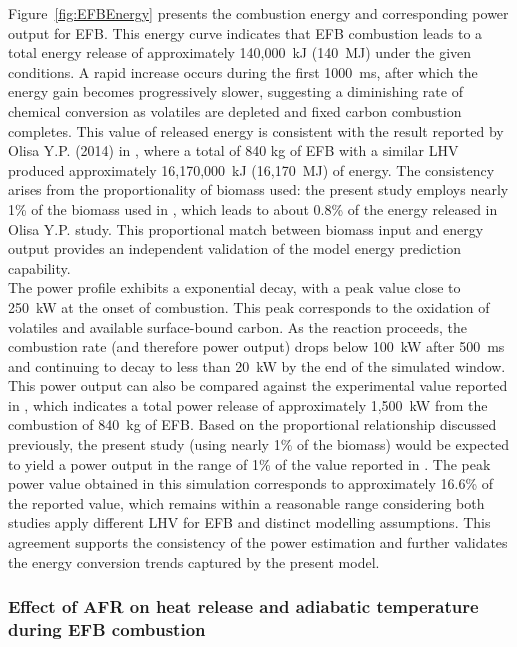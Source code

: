 \documentclass[preprint,12pt]{elsarticle}
\begin{document}
Figure~\ref{fig:EFBEnergy} presents the combustion energy and corresponding power output for EFB. This energy curve indicates that EFB combustion leads to a total energy release of approximately 140,000~kJ (140~MJ) under the given conditions. A rapid increase occurs during the first 1000~ms, after which the energy gain becomes progressively slower, suggesting a diminishing rate of chemical conversion as volatiles are depleted and fixed carbon combustion completes. This value of released energy is consistent with the result reported by Olisa Y.P. (2014) in \cite{Olisa2014}, where a total of 840 kg of EFB with a similar LHV produced approximately 16,170,000~kJ (16,170~MJ) of energy. The consistency arises from the proportionality of biomass used: the present study employs nearly 1\% of the biomass used in \cite{Olisa2014}, which leads to about 0.8\% of the energy released in Olisa Y.P. study. This proportional match between biomass input and energy output provides an independent validation of the model energy prediction capability. \\

The power profile exhibits a exponential decay, with a peak value close to 250~kW at the onset of combustion. This peak corresponds to the oxidation of volatiles and available surface-bound carbon. As the reaction proceeds, the combustion rate (and therefore power output) drops below 100~kW after 500~ms and continuing to decay to less than 20~kW by the end of the simulated window.\\

This power output can also be compared against the experimental value reported in \cite{Olisa2014}, which indicates a total power release of approximately 1,500~kW from the combustion of 840~kg of EFB. Based on the proportional relationship discussed previously, the present study (using nearly 1\% of the biomass) would be expected to yield a power output in the range of 1\% of the value reported in \cite{Olisa2014}. The peak power value obtained in this simulation corresponds to approximately 16.6\% of the reported value, which remains within a reasonable range considering both studies apply different LHV for EFB and distinct modelling assumptions. This agreement supports the consistency of the power estimation and further validates the energy conversion trends captured by the present model.\\


\subsubsection{Effect of AFR on heat release and adiabatic temperature during EFB combustion}
\label{Heat release variation with AFR during EFB combustion}\\
\end{document}
